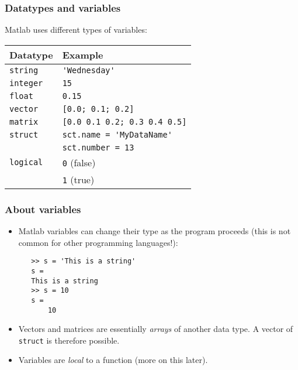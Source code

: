 \begin{frame}[fragile]
    \frametitle{Datatypes and variables}
    Matlab uses different types of variables:
        \begin{longtable}{l!{\vrule}l}
         Datatype        & Example \\ \hline
         \texttt{string} & \lstinline$'Wednesday'$ \\
         \texttt{integer}& \lstinline$15$ \\
         \texttt{float}  & \lstinline$0.15$ \\
         \texttt{vector} & \lstinline$[0.0; 0.1; 0.2]$ \\
         \texttt{matrix} & \lstinline$[0.0 0.1 0.2; 0.3 0.4 0.5]$ \\
         \texttt{struct} & \lstinline$sct.name = 'MyDataName'$ \\
                         & \lstinline$sct.number = 13$ \\
         \texttt{logical}& \lstinline$0$ (false)  \\
                         & \lstinline$1$ (true) \\
       \end{longtable}
   \end{frame}
   
   \begin{frame}[fragile]
    \frametitle{About variables}
    \begin{itemize}
      \item Matlab variables can change their type as the program proceeds (this is not common for other programming languages!):
      \begin{lstlisting}
   >> s = 'This is a string'
   s =
   This is a string
   >> s = 10
   s =
       10
   \end{lstlisting}
       \item Vectors and matrices are essentially \emph{arrays} of another data type. A vector of \lstinline$struct$ is therefore possible.
       \item Variables are \emph{local} to a function (more on this later).
   \end{itemize}
   \end{frame}

